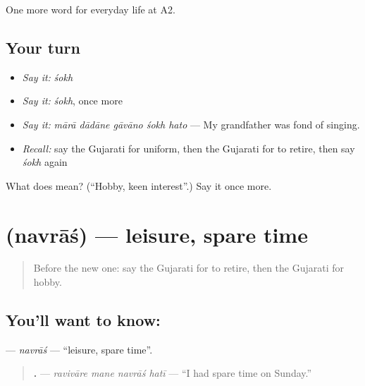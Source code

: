 \begin{grammarlens}[title={What you've built}]
One more word for everyday life at A2.
\end{grammarlens}

\subsection*{Your turn}
\begin{itemize}
\raggedright
  \item \emph{Say it:} \emph{śokh}
  \item \emph{Say it:} \emph{śokh}, once more
  \item \emph{Say it:} \emph{mārā dādāne gāvāno śokh hato} — My grandfather was fond of singing.
  \item \emph{Recall:} say the Gujarati for uniform, then the Gujarati for to retire, then say \emph{śokh} again
\end{itemize}

\begin{tcolorbox}[breakable,colback=teal!4,colframe=teal!35!black,title={Before you move on}]
What does  mean? (\textquotedblleft{}Hobby, keen interest\textquotedblright{}.) Say it once more.
\end{tcolorbox}
\section[\texorpdfstring{\gu{નવરાશ} (navrāś)}{નવરાશ (navrāś)}]{ (navrāś) — leisure, spare time}

\label{lesson:GU-C253-navrash}



\begin{quote}
Before the new one: say the Gujarati for to retire, then the Gujarati for hobby.
\end{quote}

\subsection*{You'll want to know: }
\textbf{} — \emph{navrāś} — \textquotedblleft{}leisure, spare time\textquotedblright{}.

\begin{quote}
\textbf{   .} — \emph{ravivāre mane navrāś hatī} — \textquotedblleft{}I had spare time on Sunday.\textquotedblright{}
\end{quote}

